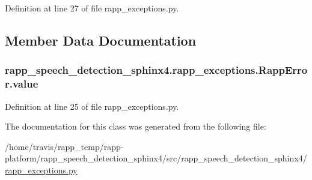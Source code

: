 Definition at line 27 of file rapp\-\_\-exceptions.\-py.



\subsection{Member Data Documentation}
\hypertarget{classrapp__speech__detection__sphinx4_1_1rapp__exceptions_1_1RappError_a2315c4cb6ee5f5681844294e1ac4c544}{
\subsubsection[{value}]{\setlength{\rightskip}{0pt plus 5cm}rapp\-\_\-speech\-\_\-detection\-\_\-sphinx4.\-rapp\-\_\-exceptions.\-Rapp\-Error.\-value}}\label{classrapp__speech__detection__sphinx4_1_1rapp__exceptions_1_1RappError_a2315c4cb6ee5f5681844294e1ac4c544}


Definition at line 25 of file rapp\-\_\-exceptions.\-py.



The documentation for this class was generated from the following file\-:\begin{DoxyCompactItemize}
\item 
/home/travis/rapp\-\_\-temp/rapp-\/platform/rapp\-\_\-speech\-\_\-detection\-\_\-sphinx4/src/rapp\-\_\-speech\-\_\-detection\-\_\-sphinx4/\hyperlink{rapp__speech__detection__sphinx4_2src_2rapp__speech__detection__sphinx4_2rapp__exceptions_8py}{rapp\-\_\-exceptions.\-py}\end{DoxyCompactItemize}
